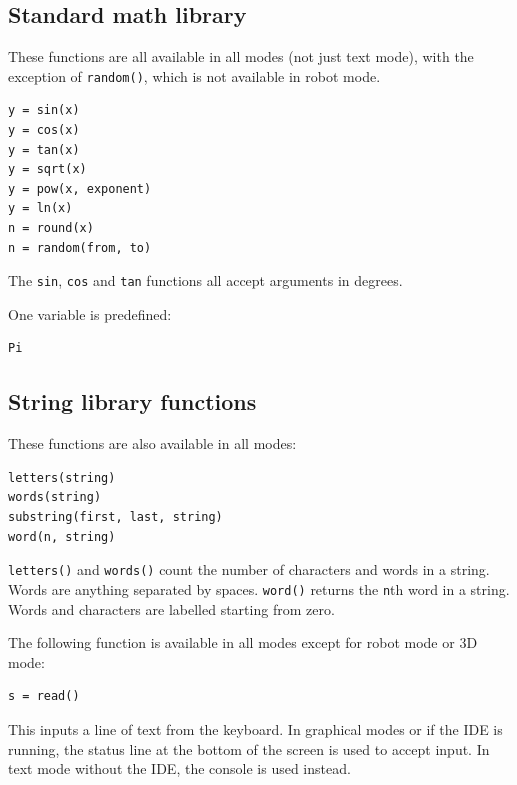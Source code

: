 \documentclass[12pt,a4paper,twoside]{article}
\renewcommand{\_}{\texttt{\symbol{95}}}
\begin{document}
\subsection{Standard math library} \label{sec:stand-math-libr}

These functions are all available in all modes (not just text mode),
with the exception of \verb^random()^, which is not available in
robot mode.

\begin{verbatim}
y = sin(x)
y = cos(x)
y = tan(x)
y = sqrt(x)
y = pow(x, exponent)
y = ln(x)
n = round(x)
n = random(from, to)
\end{verbatim}

The \verb^sin^, \verb^cos^ and \verb^tan^ functions all accept
arguments in degrees.

One variable is predefined:

\begin{verbatim}
Pi
\end{verbatim}

\subsection{String library functions} \label{sec:string-libr-funct} 

These functions are also available in all modes:

\begin{verbatim}
letters(string)
words(string)
substring(first, last, string)
word(n, string)
\end{verbatim}

\verb^letters()^ and \verb^words()^ count the number of characters
and words in a string. Words are anything separated by spaces.
\verb^word()^ returns the \verb^n^th word in a string. Words and
characters are labelled starting from zero.

The following function is available in all modes except for robot
mode or 3D mode:

\begin{verbatim}
s = read()
\end{verbatim}

This inputs a line of text from the keyboard. In graphical modes or if
the IDE is running, the status line at the bottom of the screen is used
to accept input. In text mode without the IDE, the console is used instead.
\end{document}
